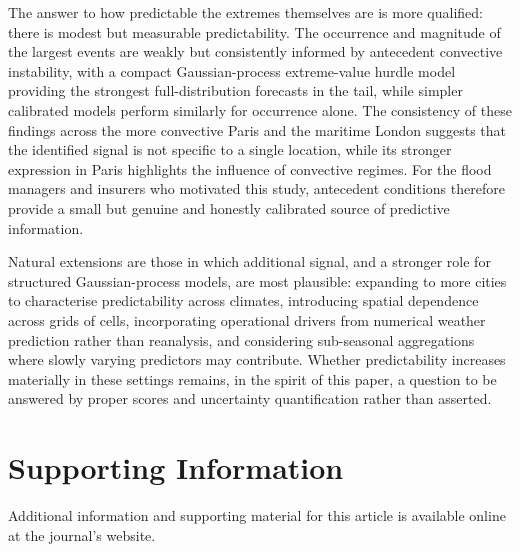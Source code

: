 \documentclass[11pt,a4paper]{article}
\begin{document}
The answer to how predictable the extremes themselves are is more qualified:
there is modest but measurable predictability. The occurrence and magnitude of
the largest events are weakly but consistently informed by antecedent
convective instability, with a compact Gaussian-process extreme-value hurdle
model providing the strongest full-distribution forecasts in the tail, while
simpler calibrated models perform similarly for occurrence alone. The
consistency of these findings across the more convective Paris and the maritime
London suggests that the identified signal is not specific to a single location,
while its stronger expression in Paris highlights the influence of convective
regimes. For the flood managers and insurers who motivated this study,
antecedent conditions therefore provide a small but genuine and honestly
calibrated source of predictive information.

Natural extensions are those in which additional signal, and a stronger role
for structured Gaussian-process models, are most plausible: expanding to more
cities to characterise predictability across climates, introducing spatial
dependence across grids of cells, incorporating operational drivers from
numerical weather prediction rather than reanalysis, and considering
sub-seasonal aggregations where slowly varying predictors may contribute.
Whether predictability increases materially in these settings remains, in the
spirit of this paper, a question to be answered by proper scores and uncertainty
quantification rather than asserted.



\section*{Supporting Information}
Additional information and supporting material for this article is available online at the journal's website.

\end{document}
